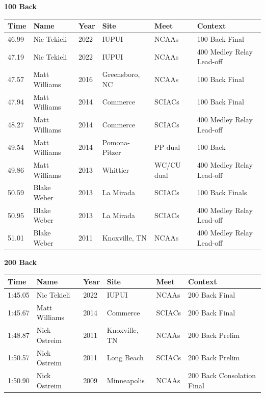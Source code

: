 \vspace{1.2em}
\noindent\begin{minipage}[t]{0.98\textwidth}
\centering
\textbf{\textcolor{teamprimary}{100 Back}}\par
\vspace{0.5em}
\centering
\small
\renewcommand{\arraystretch}{1.0}
\setlength{\tabcolsep}{4pt}
\begin{tabular}{@{}p{2.0cm}p{3.2cm}p{1.2cm}p{2.0cm}p{2.0cm}p{2.5cm}@{}}
\toprule
\textbf{Time} & \textbf{Name} & \textbf{Year} & \textbf{Site} & \textbf{Meet} & \textbf{Context} \\
\midrule
46.99 & Nic Tekieli & 2022 & IUPUI & NCAAs & 100 Back Final \\
47.19 & Nic Tekieli & 2022 & IUPUI & NCAAs & 400 Medley Relay Lead-off \\
47.57 & Matt Williams & 2016 & Greensboro, NC & NCAAs & 100 Back Final \\
47.94 & Matt Williams & 2014 & Commerce & SCIACs & 100 Back Final \\
48.27 & Matt Williams & 2014 & Commerce & SCIACs & 400 Medley Relay Lead-off \\
49.54 & Matt Williams & 2014 & Pomona-Pitzer & PP dual & 100 Back \\
49.86 & Matt Williams & 2013 & Whittier & WC/CU dual & 400 Medley Relay Lead-off \\
50.59 & Blake Weber & 2013 & La Mirada & SCIACs & 100 Back Finals \\
50.95 & Blake Weber & 2013 & La Mirada & SCIACs & 400 Medley Relay Lead-off \\
51.01 & Blake Weber & 2011 & Knoxville, TN & NCAAs & 400 Medley Relay Lead-off \\
\bottomrule
\end{tabular}
\end{minipage}
\vspace{1.2em}
\noindent\begin{minipage}[t]{0.98\textwidth}
\centering
\textbf{\textcolor{teamprimary}{200 Back}}\par
\vspace{0.5em}
\centering
\small
\renewcommand{\arraystretch}{1.0}
\setlength{\tabcolsep}{4pt}
\begin{tabular}{@{}p{2.0cm}p{3.2cm}p{1.2cm}p{2.0cm}p{2.0cm}p{2.5cm}@{}}
\toprule
\textbf{Time} & \textbf{Name} & \textbf{Year} & \textbf{Site} & \textbf{Meet} & \textbf{Context} \\
\midrule
1:45.05 & Nic Tekieli & 2022 & IUPUI & NCAAs & 200 Back Final \\
1:45.67 & Matt Williams & 2014 & Commerce & SCIACs & 200 Back Final \\
1:48.87 & Nick Ostreim & 2011 & Knoxville, TN & NCAAs & 200 Back Prelim \\
1:50.57 & Nick Ostreim & 2011 & Long Beach & SCIACs & 200 Back Prelim \\
1:50.90 & Nick Ostreim & 2009 & Minneapolis & NCAAs & 200 Back Consolation Final \\
\bottomrule
\end{tabular}
\end{minipage}
